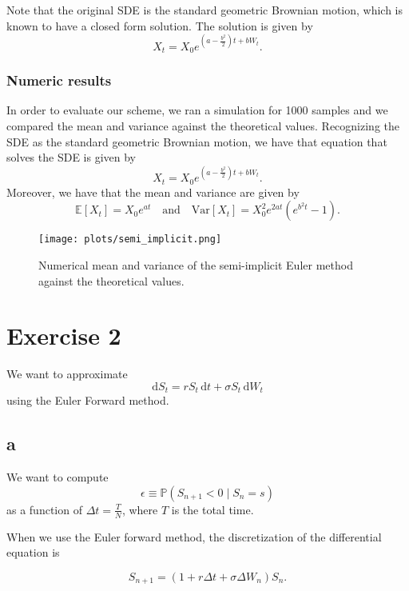 \documentclass[a4paper,12pt]{article} %
\newcommand{\Var}{\mathrm{Var}}
\begin{document}
Note that the original SDE is the standard geometric Brownian motion, which is known to have a closed form solution. The solution is given by
\begin{equation}
    X_t = X_0 e^{(a-\frac{b^2}{2})t + bW_t}.
\end{equation}

\subsubsection{Numeric results}
In order to evaluate our scheme, we ran a simulation for 1000 samples and we compared the mean and variance against the theoretical values. Recognizing the SDE as the standard geometric Brownian motion, we have that equation that solves the SDE is given by
\begin{equation}
    X_t = X_0 e^{(a-\frac{b^2}{2})t + bW_t}.
\end{equation}
Moreover, we have that the mean and variance are given by
\begin{equation}
    \mathbb{E} \left[ X_t \right] = X_0 e^{at} \quad \text{and} \quad \Var \left[ X_t \right] = X_0^2 e^{2at} (e^{b^2t}-1).
\end{equation}
\begin{figure}[h!]
    \centering
    \texttt{[image: plots/semi\_implicit.png]} %
    \caption{Numerical mean and variance of the semi-implicit Euler method against the theoretical values.}
    \label{fig:covariance}
\end{figure}


\newpage

\section{Exercise 2}
We want to approximate
$$\mathrm{d}S_t = r S_t \, \mathrm{d}t + \sigma S_t \, \mathrm{d}W_t$$
using the Euler Forward method.

\subsection{a}
We want to compute
$$\epsilon \equiv \mathbb{P}(S_{n+1} < 0 \mid S_n = s)$$
as a function of $\Delta t= \frac{T}{N}$, where $T$ is the total time.

When we use the Euler forward method, the discretization of the differential equation is

\begin{equation}
    S_{n+1} = (1 + r \Delta t + \sigma \Delta W_n) S_n.
\end{equation}
\end{document}
